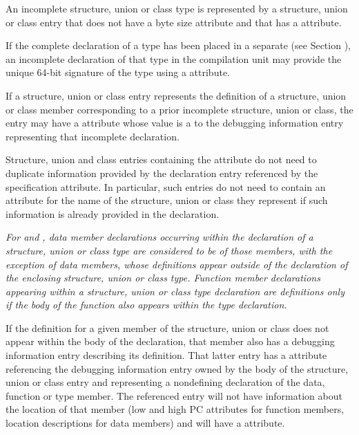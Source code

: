 An incomplete structure, union or class type 
is 
represented by a structure, union or class
entry that does not have a byte size attribute and that has
a \DWATdeclaration{} attribute.

If the complete declaration of a type has been placed in
\hypertarget{chap:DWATsignaturetypesignature}{}
a separate 
(see Section ), 
an incomplete declaration 
of that type in the compilation unit may provide
the unique 64-bit signature of the type using a
\DWATsignatureDEFN{} attribute.

If a structure, union or class entry represents the definition
of a structure, union or class member corresponding to a prior
incomplete structure, union or class, the entry may have a
\DWATspecification{} attribute 
whose value is a  to
the debugging information entry representing that incomplete
declaration.

Structure, union and class entries containing the
\DWATspecification{} attribute 
do not need to duplicate
information provided by the declaration entry referenced by the
specification attribute.  In particular, such entries do not
need to contain an attribute for the name of the structure,
union or class they represent if such information is already
provided in the declaration.

\textit{For  and , 
data 
member declarations occurring within
the declaration of a structure, union or class type are
considered to be  of those members, with
the exception of  data members, whose definitions
appear outside of the declaration of the enclosing structure,
union or class type. Function member declarations appearing
within a structure, union or class type declaration are
definitions only if the body of the function also appears
within the type declaration.}

If the definition for a given member of the structure, union
or class does not appear within the body of the declaration,
that member also has a debugging information entry describing
its definition. That latter entry has a 
\DWATspecification{} attribute 
referencing the debugging information entry
owned by the body of the structure, union or class entry and
representing a non\dash defining declaration of the data, function
or type member. The referenced entry will not have information
about the location of that member (low and high PC attributes
for function members, location descriptions for data members)
and will have a \DWATdeclaration{} attribute.

